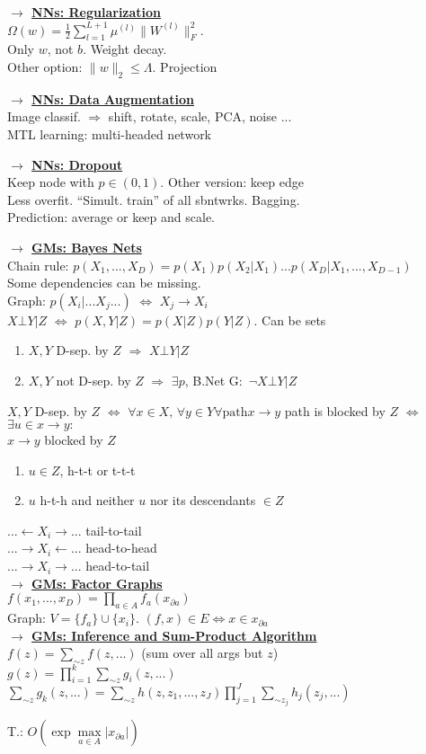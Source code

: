 \documentclass[11pt]{article}
\newcommand{\mytitle}[1]{ {\bf $\rightarrow$ \underline{#1}}\\}
\begin{document}
\begin{multicols*}{2}
\mytitle{NNs: Regularization}
$\Omega(w)=\frac{1}{2}\sum\limits_{l=1}^{L+1}\mu^{(l)}\|W^{(l)}\|_F^2$.\\
Only $w$, not $b$. Weight decay.\\
Other option: $\|w\|_2\leqslant \Lambda$. Projection

\mytitle{NNs: Data Augmentation}
Image classif. $\Rightarrow$ shift, rotate, scale, PCA, noise ...\\
MTL learning: multi-headed network

\mytitle{NNs: Dropout}
Keep node with $p\in(0,1)$. Other version: keep edge\\
Less overfit. ``Simult. train'' of all sbntwrks. Bagging.\\
Prediction: average or keep and scale.

\mytitle{GMs: Bayes Nets}
Chain rule: $p(X_1,...,X_D)=p(X_1)p(X_2|X_1)...p(X_D|X_1,...,X_{D-1})$\\
Some dependencies can be missing.\\
Graph: $p(X_i|...X_j...)$ $\Leftrightarrow$ $X_j\to X_i$\\
$X\bot Y|Z$ $\Leftrightarrow$ $p(X, Y|Z)=p(X|Z)p(Y|Z)$. Can be sets\\
\begin{enumerate}
	\item $X, Y$ D-sep. by $Z$ $\Rightarrow$ $X\bot Y|Z$
	\item $X, Y$ not D-sep. by $Z$ $\Rightarrow$ $\exists p$, B.Net G$\colon$ $\neg X\bot Y|Z$
\end{enumerate}
$X,Y$ D-sep. by $Z$ $\Leftrightarrow$ $\forall x\in X,\,\forall y\in Y \forall \mbox{path} x\to y$ path is blocked by $Z$ $\Leftrightarrow$ $\exists u\in x\to y\colon$\\
$x\to y$ blocked by $Z$
\begin{enumerate}
	\item $u\in Z$, h-t-t or t-t-t
	\item $u$ h-t-h and neither $u$ nor its descendants $\in Z$
\end{enumerate}
$...\leftarrow X_i\rightarrow...$ tail-to-tail\\
$...\rightarrow X_i\leftarrow...$ head-to-head\\
$...\rightarrow X_i\rightarrow...$ head-to-tail\\
\mytitle{GMs: Factor Graphs}
$f(x_1,...,x_D)=\prod\limits_{a\in A}f_a(x_{\partial a})$\\
Graph: $V=\{f_a\}\cup\{x_i\}$. $(f,x)\in E\Leftrightarrow x\in x_{\partial a}$\\

\mytitle{GMs: Inference and Sum-Product Algorithm}
$f(z)=\sum\limits_{\sim z}f(z,...)$ (sum over all args but $z$)\\
$g(z)=\prod\limits_{i=1}^k\sum\limits_{\sim z}g_i(z,...)$\\
$\sum\limits_{\sim z}g_k(z,...)=\sum\limits_{\sim z}h(z,z_1,...,z_J)\prod\limits_{j=1}^J\sum\limits_{\sim z_j}h_j(z_j,...)$

T.: $O\left(\exp \max\limits_{a\in A}|x_{\partial a}|\right)$
\end{multicols*}
\end{document}

